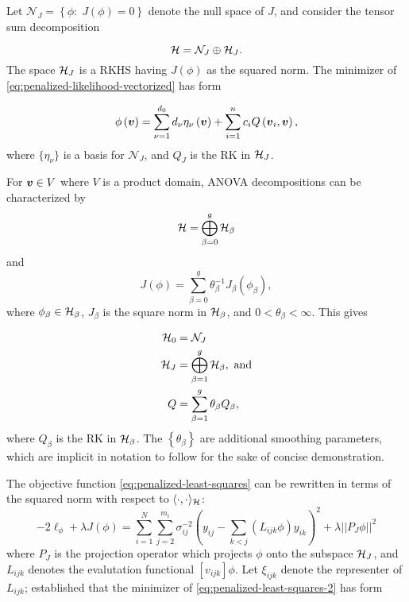 Let $\mathcal{N}_J = \left\{ \phi:\; J\left(\phi\right) = 0\right\}$ denote the null space of $J$, and consider the tensor sum decomposition

\[
\mathcal{H} = \mathcal{N}_J \oplus \mathcal{H}_J.
\]
\noindent
The space $\mathcal{H}_J$ is a RKHS having $J\left(\phi\right)$ as the squared norm. The minimizer of \ref{eq:penalized-likelihood-vectorized} has form 

\begin{equation} \label{eq:RKHS-functional-form}
\phi\left(\mbox{\boldmath $v$}\right) = \sum_{\nu = 1}^{d_0} d_\nu \eta_\nu\left( \mbox{\boldmath $v$} \right) + \sum_{i=1}^n c_i Q\left(\mbox{\boldmath $v$}_i, \mbox{\boldmath $v$} \right),
\end{equation} 
\bigskip
\noindent
where $\lbrace \eta_\nu \rbrace$ is a basis for $\mathcal{N}_J$, and $Q_J$ is the RK in $\mathcal{H}_J$. 

\bigskip

For $\mbox{\boldmath $v$} \in V$ where $V$ is a product domain, ANOVA decompositions can be characterized by 
\begin{equation}\label{eq:ssanova-decomposition-of-RKHS}
\mathcal{H} = \bigoplus\limits_{\beta=0}^{g} \mathcal{H}_\beta
\end{equation}
\noindent
and
\begin{equation}\label{eq:ssanova-decomposition-of-penalty}
J\left(\phi\right) = \sum_{\beta=0}^{g} \theta^{-1}_\beta J_\beta \left( \phi_\beta \right),
\end{equation}
\noindent
where $\phi_\beta \in \mathcal{H}_\beta$, $J_\beta$ is the square norm in $\mathcal{H}_\beta$, and $0 < \theta_\beta < \infty$. This gives 

\begin{align*}
\mathcal{H}_0 &= \mathcal{N}_J \\
\mathcal{H}_J &= \bigoplus\limits_{\beta=1}^{g} \mathcal{H}_\beta, \mbox{ and} \\
Q &= \sum_{\beta=1}^g \theta_\beta Q_\beta,
\end{align*}
\noindent
where $Q_\beta$ is the RK in $\mathcal{H}_\beta$. The $\left \{ \theta_\beta \right\}$ are additional smoothing parameters, which are implicit in notation to follow for the sake of concise demonstration. 

\bigskip

\bigskip

The objective function \ref{eq:penalized-least-squares} can be rewritten in terms of the squared norm with respect to $\langle\cdot,\cdot\rangle_{\mathcal{H}}$:
\begin{equation} \label{eq:penalized-least-squares-2}
-2\ell_\phi + \lambda J\left(\phi\right) = \sum_{i=1}^N \sum_{j=2}^{m_i} \sigma^{-2}_{ij}\left( y_{ij} - \sum_{k<j}\left( L_{ijk}\phi\right) y_{ik}  \right)^2 + \lambda \vert\vert P_J \phi \vert \vert^2
\end{equation}
\noindent
where $P_J$ is the projection operator which projects $\phi$ onto the subspace $\mathcal{H}_J$, and $L_{ijk}$ denotes the evalutation functional $\left[v_{ijk}\right] \phi$. Let $\xi_{ijk}$ denote the representer of $L_{ijk}$; \citet{kimeldorf1971some} established that the minimizer of \ref{eq:penalized-least-squares-2} has form

